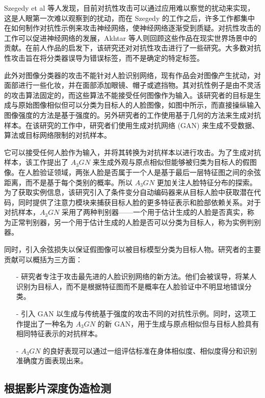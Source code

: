 Szegedy et al 等人发现，目前对抗性攻击可以通过应用难以察觉的扰动来实现，这是人眼第一次难以观察到的扰动，而在 Szegedy 的工作之后，许多工作都集中在如何制作对抗性示例来攻击神经网络，使神经网络逐渐受到质疑。对抗性攻击的工作可以促进神经网络的发展，Akhtar 等人则回顾这些作品在现实世界场景中的贡献。在前人作品的启发下，该研究还对对抗性攻击进行了一些研究。大多数对抗性攻击旨在将分类器误导为错误标签，而不是确定的特定标签。

此外对图像分类器的攻击不能针对人脸识别网络，现有作品会对图像产生扰动，对面部进行一些化妆，并在面部添加眼镜、帽子或遮挡物。其对抗性例子是由不灵活的攻击算法固定的，而这些算法不能接受任何图像作为输入。该研究者的目标是生成与原始图像相似但可以分类为目标人的人脸图像，如图中所示，而直接操纵输入图像强度的方法是基于强度的。另外研究者的工作使用基于几何的方法来生成对抗样本。在该研究的工作中，研究者们使用生成对抗网络 (GAN) 来生成不受数据、算法或目标网络限制的对抗样本。

它可以接受任何人脸作为输入，并将其转换为对抗样本以进行攻击。为了生成对抗样本，该工作提出了 $A_{3}GN$ 来生成外观与原点相似但能够被归类为目标人的假图像。在人脸验证领域，两张人脸是否属于一个人是基于最后一层特征图之间的余弦距离，而不是基于每个类别的概率。所以 $A_{3}GN$ 更加关注人脸特征分布的探索。为了获取实例信息，该研究引入了条件变分自动编码器来从目标人脸中获取潜在代码，同时提供了注意力模块来捕获目标人脸的更多特征表示和脸部依赖关系。对于对抗样本，$A_{3}GN$ 采用了两种判别器——一个用于估计生成的人脸是否真实，称为正常判别器，另一个用于估计生成的人脸是否可以分类为目标人，称为实例判别器。

同时，引入余弦损失以保证假图像可以被目标模型分类为目标人物。研究者的主要贡献可以概括为三方面：

\begin{itemize}
\item [-] 研究者专注于攻击最先进的人脸识别网络的新方法。他们会被误导，将某人识别为目标人，而不是根据特征图而不是概率在人脸验证中不明显地错误分类。
\item [-] 引入 GAN 以生成与传统基于强度的攻击不同的对抗性示例。同时，这项工作提出了一种名为 $A_{3}GN$ 的新 GAN，用于生成与原点相似但与目标人脸具有相同特征表示的对抗样本。
\item [-] $A_{3}GN$ 的良好表现可以通过一组评估标准在身体相似度、相似度得分和识别准确度方面表现出来。
\end{itemize}

\subsection{根据影片深度伪造检测}

